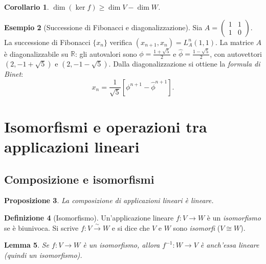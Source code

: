 \documentclass[11pt, a4paper]{book}
\theoremstyle{definition}
\newtheorem{definizione}{Definizione}[section]
\newtheorem{esempio}[definizione]{Esempio}
\theoremstyle{plain}
\newtheorem{proposizione}[definizione]{Proposizione}
\newtheorem{lemma}[definizione]{Lemma}
\newtheorem{corollario}[definizione]{Corollario}
\theoremstyle{remark}
\newcommand{\R}{\mathbb{R}}
\begin{document}
\begin{corollario}
$\dim(\ker f) \geq \dim V - \dim W$.
\end{corollario}

\begin{exbox}
\begin{esempio}[Successione di Fibonacci e diagonalizzazione]
Sia $A = \begin{pmatrix} 1 & 1 \\ 1 & 0 \end{pmatrix}$. La successione di Fibonacci $\{x_n\}$ verifica $(x_{n+1}, x_n) = L_A^n(1,1)$. La matrice $A$ è diagonalizzabile su $\R$: gli autovalori sono $\phi = \frac{1+\sqrt{5}}{2}$ e $\hat\phi = \frac{1-\sqrt{5}}{2}$, con autovettori $(2, -1+\sqrt{5})$ e $(2, -1-\sqrt{5})$. Dalla diagonalizzazione si ottiene la \emph{formula di Binet}:
\[
  x_n = \frac{1}{\sqrt{5}}\left[\phi^{n+1} - \hat\phi^{n+1}\right].
\]
\end{esempio}
\end{exbox}

\section{Isomorfismi e operazioni tra applicazioni lineari}
\label{sec:iso}

\subsection{Composizione e isomorfismi}

\begin{proposizione}
La composizione di applicazioni lineari è lineare.
\end{proposizione}

\begin{defbox}
\begin{definizione}[Isomorfismo]
Un'applicazione lineare $f \colon V \to W$ è un \emph{isomorfismo} se è biunivoca. Si scrive $f \colon V \xrightarrow{\sim} W$ e si dice che $V$ e $W$ sono \emph{isomorfi} ($V \cong W$).
\end{definizione}
\end{defbox}

\begin{lemma}
Se $f \colon V \to W$ è un isomorfismo, allora $f^{-1} \colon W \to V$ è anch'essa lineare (quindi un isomorfismo).
\end{lemma}
\end{document}

